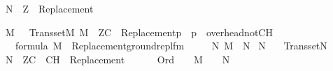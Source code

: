 \begin{isabelle}
N\ {\isasymTurnstile}\ {\isasymcdot}Z{\isasymcdot}\ {\isasymunion}\ {\isacharbraceleft}{\kern0pt}{\isasymcdot}Replacement{\isacharparenleft}{\kern0pt}{\isasymphi}{\isacharparenright}{\kern0pt}{\isasymcdot}\ {\isachardot}{\kern0pt}\ {\isasymphi}\ {\isasymin}\ {\isasymPhi}{\isacharbraceright}{\kern0pt}%
\end{isabelle}%
\begin{isabelle}%
{\isasymlbrakk}M\ {\isasymapprox}\ {\isasymomega}{\isacharsemicolon}{\kern0pt}\ Transset{\isacharparenleft}{\kern0pt}M{\isacharparenright}{\kern0pt}{\isacharsemicolon}{\kern0pt}\ M\ {\isasymTurnstile}\ ZC\ {\isasymunion}\ {\isacharbraceleft}{\kern0pt}{\isasymcdot}Replacement{\isacharparenleft}{\kern0pt}p{\isacharparenright}{\kern0pt}{\isasymcdot}\ {\isachardot}{\kern0pt}\ p\ {\isasymin}\ overhead{\isacharunderscore}{\kern0pt}notCH{\isacharbraceright}{\kern0pt}{\isacharsemicolon}{\kern0pt}\isanewline
\isaindent{\ }{\isasymPhi}\ {\isasymsubseteq}\ formula{\isacharsemicolon}{\kern0pt}\ M\ {\isasymTurnstile}\ {\isacharbraceleft}{\kern0pt}{\isasymcdot}Replacement{\isacharparenleft}{\kern0pt}ground{\isacharunderscore}{\kern0pt}repl{\isacharunderscore}{\kern0pt}fm{\isacharparenleft}{\kern0pt}{\isasymphi}{\isacharparenright}{\kern0pt}{\isacharparenright}{\kern0pt}{\isasymcdot}\ {\isachardot}{\kern0pt}\ {\isasymphi}\ {\isasymin}\ {\isasymPhi}{\isacharbraceright}{\kern0pt}{\isasymrbrakk}\isanewline
{\isasymLongrightarrow}\ {\isasymexists}N{\isachardot}{\kern0pt}\ M\ {\isasymsubseteq}\ N\ {\isasymand}\isanewline
{}N\ {\isasymapprox}\ {\isasymomega}\ {\isasymand}\isanewline
{}Transset{\isacharparenleft}{\kern0pt}N{\isacharparenright}{\kern0pt}\ {\isasymand}\isanewline
{}N\ {\isasymTurnstile}\ ZC\ {\isasymunion}\ {\isacharbraceleft}{\kern0pt}{\isasymcdot}{\isasymnot}{\isasymcdot}CH{\isasymcdot}{\isasymcdot}{\isacharbraceright}{\kern0pt}\ {\isasymunion}\ {\isacharbraceleft}{\kern0pt}{\isasymcdot}Replacement{\isacharparenleft}{\kern0pt}{\isasymphi}{\isacharparenright}{\kern0pt}{\isasymcdot}\ {\isachardot}{\kern0pt}\ {\isasymphi}\ {\isasymin}\ {\isasymPhi}{\isacharbraceright}{\kern0pt}\ {\isasymand}\isanewline
{}\ Ord{\isacharparenleft}{\kern0pt}{\isasymalpha}{\isacharparenright}{\kern0pt}\ {\isasymlongrightarrow}\ {\isasymalpha}\ {\isasymin}\ M\ {\isasymlongleftrightarrow}\ {\isasymalpha}\ {\isasymin}\ N{\isacharparenright}{\kern0pt}%
\end{isabelle}%
